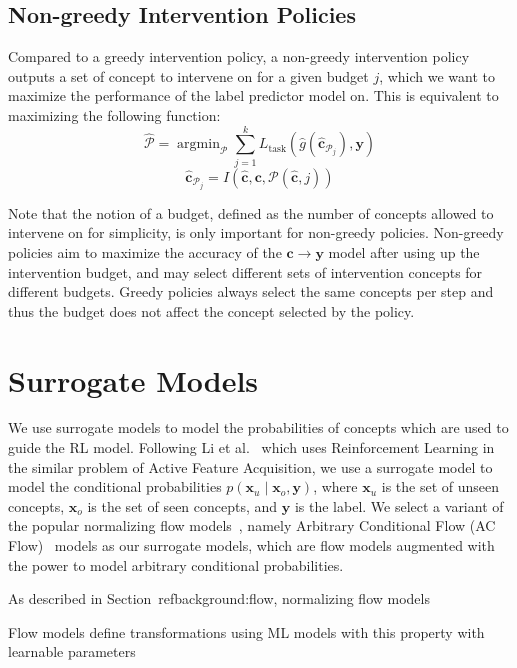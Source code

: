 \documentclass[../main.tex]{subfiles}
\begin{document}
\subsection{Non-greedy Intervention Policies}

Compared to a greedy intervention policy, a non-greedy intervention 
policy outputs a set of concept to intervene on for a given budget $j$,
which we want to maximize the performance of the 
label predictor model on. This is equivalent to maximizing the following 
function:
\[\hat{\mathcal{P}} = \mathop{\mathrm{argmin}}_{\mathcal{P}} \sum_{j=1}^k L_{\text{task}}(\hat{g}(\hat{\mathbf{c}}_{\mathcal{P}_j}), \mathbf{y}) \]
\[\hat{\mathbf{c}}_{\mathcal{P}_j} = I(\hat{\mathbf{c}}, \mathbf{c}, \mathcal{P}(\hat{\mathbf{c}}, j))\]

Note that the notion of a budget, defined as the number
of concepts allowed to intervene on for simplicity, is only
important for non-greedy policies. Non-greedy policies aim
to maximize the accuracy of the $\mathbf{c} \to \mathbf{y}$ model after using up the intervention budget,
and may select different sets of intervention concepts 
for different budgets. Greedy policies always select the same
concepts per step and thus the budget does not 
affect the concept selected by the policy.


\section{Surrogate Models}\label{method:surrogate}

We use surrogate models to model the probabilities of concepts which are used
to guide the RL model. Following Li et al.~\cite{afa} which uses Reinforcement Learning
in the similar problem of Active Feature Acquisition, we use a surrogate model to model
the conditional probabilities $p(\mathbf{x}_u \mid \mathbf{x}_o, \mathbf{y})$, 
where $\mathbf{x}_u$ is the set of unseen concepts, $\mathbf{x}_o$ is the set of seen concepts,
and $\mathbf{y}$ is the label. We select a variant of the popular normalizing flow models~\cite{normalizing-flows},
namely Arbitrary Conditional Flow (AC Flow)~\cite{acflow}
models as our surrogate models, 
which are flow models augmented with the power to model arbitrary conditional probabilities.

As described in Section~ref{background:flow}, normalizing flow models 


Flow models define transformations
using ML models with this property with learnable parameters
\end{document}
